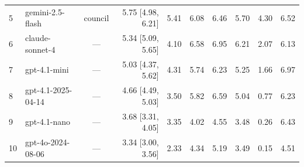 \documentclass{article}
\begin{document}
\begin{table}[htb]
\begin{center}
{\begin{tabular}{@{}llcrrrrrrr@{}}
5 & gemini-2.5-flash & council &\cellcolor[HTML]{2BA0C2}\textcolor[HTML]{EEF3F8}{5.75 {[}4.98, 6.21{]}}&\cellcolor[HTML]{35AAC3}\textcolor[HTML]{EEF3F8}{5.41}&\cellcolor[HTML]{2296C1}\textcolor[HTML]{EEF3F8}{6.08}&\cellcolor[HTML]{1E88BC}\textcolor[HTML]{EEF3F8}{6.46}&\cellcolor[HTML]{2DA1C2}\textcolor[HTML]{EEF3F8}{5.70}&\cellcolor[HTML]{64C3BF}\textcolor[HTML]{1A1A1A}{4.30}&\cellcolor[HTML]{1E86BB}\textcolor[HTML]{EEF3F8}{6.52} \\
6 & claude-sonnet-4 & --- &\cellcolor[HTML]{37ACC3}\textcolor[HTML]{EEF3F8}{5.34 {[}5.09, 5.65{]}}&\cellcolor[HTML]{6EC7BE}\textcolor[HTML]{1A1A1A}{4.10}&\cellcolor[HTML]{1E84BA}\textcolor[HTML]{EEF3F8}{6.58}&\cellcolor[HTML]{2074B3}\textcolor[HTML]{EEF3F8}{6.95}&\cellcolor[HTML]{1E92C0}\textcolor[HTML]{EEF3F8}{6.21}&\cellcolor[HTML]{D4EEB3}\textcolor[HTML]{1A1A1A}{2.07}&\cellcolor[HTML]{2095C0}\textcolor[HTML]{EEF3F8}{6.13} \\
7 & gpt-4.1-mini & --- &\cellcolor[HTML]{40B5C4}\textcolor[HTML]{1A1A1A}{5.03 {[}4.37, 5.62{]}}&\cellcolor[HTML]{63C3BF}\textcolor[HTML]{1A1A1A}{4.31}&\cellcolor[HTML]{2CA0C2}\textcolor[HTML]{EEF3F8}{5.74}&\cellcolor[HTML]{1E92C0}\textcolor[HTML]{EEF3F8}{6.23}&\cellcolor[HTML]{3AAFC3}\textcolor[HTML]{1A1A1A}{5.25}&\cellcolor[HTML]{E1F3B2}\textcolor[HTML]{1A1A1A}{1.66}&\cellcolor[HTML]{2074B2}\textcolor[HTML]{EEF3F8}{6.97} \\
8 & gpt-4.1-2025-04-14 & --- &\cellcolor[HTML]{52BCC2}\textcolor[HTML]{1A1A1A}{4.66 {[}4.49, 5.03{]}}&\cellcolor[HTML]{8DD3BA}\textcolor[HTML]{1A1A1A}{3.50}&\cellcolor[HTML]{299EC1}\textcolor[HTML]{EEF3F8}{5.82}&\cellcolor[HTML]{1E83B9}\textcolor[HTML]{EEF3F8}{6.59}&\cellcolor[HTML]{40B5C4}\textcolor[HTML]{1A1A1A}{5.04}&\cellcolor[HTML]{F4FBC0}\textcolor[HTML]{1A1A1A}{0.77}&\cellcolor[HTML]{1E92C0}\textcolor[HTML]{EEF3F8}{6.23} \\
9 & gpt-4.1-nano & --- &\cellcolor[HTML]{83CFBB}\textcolor[HTML]{1A1A1A}{3.68 {[}3.31, 4.05{]}}&\cellcolor[HTML]{96D6B9}\textcolor[HTML]{1A1A1A}{3.35}&\cellcolor[HTML]{72C8BD}\textcolor[HTML]{1A1A1A}{4.02}&\cellcolor[HTML]{57BEC1}\textcolor[HTML]{1A1A1A}{4.55}&\cellcolor[HTML]{8FD3B9}\textcolor[HTML]{1A1A1A}{3.48}&\cellcolor[HTML]{FBFED1}\textcolor[HTML]{1A1A1A}{0.26}&\cellcolor[HTML]{1E8ABD}\textcolor[HTML]{EEF3F8}{6.43} \\
10 & gpt-4o-2024-08-06 & --- &\cellcolor[HTML]{97D6B9}\textcolor[HTML]{1A1A1A}{3.34 {[}3.00, 3.56{]}}&\cellcolor[HTML]{CCEBB4}\textcolor[HTML]{1A1A1A}{2.33}&\cellcolor[HTML]{62C2BF}\textcolor[HTML]{1A1A1A}{4.34}&\cellcolor[HTML]{3CB0C3}\textcolor[HTML]{1A1A1A}{5.19}&\cellcolor[HTML]{8ED3BA}\textcolor[HTML]{1A1A1A}{3.49}&\cellcolor[HTML]{FDFED4}\textcolor[HTML]{1A1A1A}{0.15}&\cellcolor[HTML]{59BFC0}\textcolor[HTML]{1A1A1A}{4.51} \\

\end{tabular}}
\end{center}
\end{table}
\end{document}
